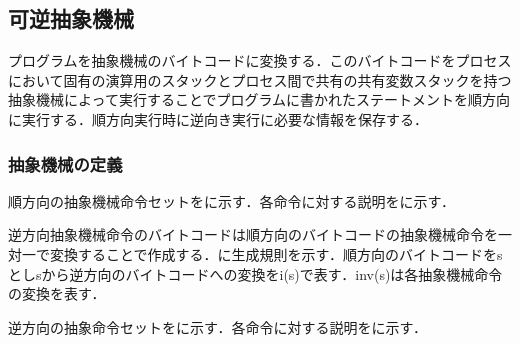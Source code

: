 \documentclass[submit,PRO]{ipsj}
\begin{document}
\subsection{可逆抽象機械}
\label{sec:format}

プログラムを抽象機械のバイトコードに変換する．このバイトコードをプロセスにおいて固有の演算用のスタックとプロセス間で共有の共有変数スタックを持つ抽象機械によって実行することでプログラムに書かれたステートメントを順方向に実行する．順方向実行時に逆向き実行に必要な情報を保存する．




\subsubsection{抽象機械の定義}

順方向の抽象機械命令セットをに示す．各命令に対する説明をに示す．

逆方向抽象機械命令のバイトコードは順方向のバイトコードの抽象機械命令を一対一で変換することで作成する．に生成規則を示す．順方向のバイトコードをsとしsから逆方向のバイトコードへの変換をi(s)で表す．inv(s)は各抽象機械命令の変換を表す．

逆方向の抽象命令セットをに示す．各命令に対する説明をに示す．
\end{document}
